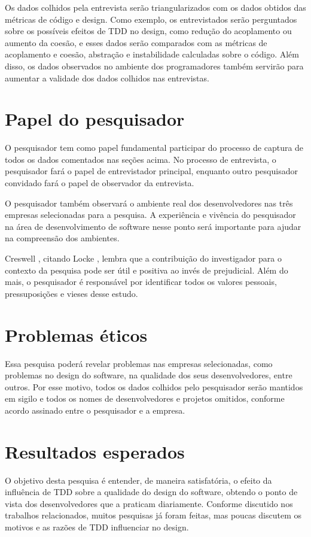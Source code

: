 Os dados colhidos pela entrevista serão triangularizados com os dados obtidos das métricas de código e design. 
Como exemplo, os entrevistados serão perguntados sobre os possíveis efeitos de TDD no design, como redução do acoplamento ou
aumento da coesão, e esses dados serão comparados com as métricas de acoplamento e coesão, abstração e instabilidade 
calculadas sobre o código.
Além disso, os dados observados no ambiente dos programadores também servirão para aumentar a validade dos 
dados colhidos nas entrevistas.

\section{Papel do pesquisador}
\label{sec:planejamento-papel}

O pesquisador tem como papel fundamental participar do processo de captura de todos os dados comentados
nas seções acima. No processo de entrevista, o pesquisador fará o papel de entrevistador principal, enquanto outro
pesquisador convidado fará o papel de observador da entrevista.

O pesquisador também observará o ambiente real dos desenvolvedores nas três empresas selecionadas
para a pesquisa. A experiência e vivência do pesquisador na área de desenvolvimento de software 
nesse ponto será importante para ajudar na compreensão dos ambientes. 

Creswell \cite{creswell}, citando Locke \cite{locke}, lembra
que a contribuição do investigador para o contexto da pesquisa pode ser útil e positiva ao invés de prejudicial.
Além do mais, o pesquisador é responsável por identificar todos os valores pessoais, pressuposições e vieses desse estudo.

\section{Problemas éticos}
\label{sec:planejamento-etica}

Essa pesquisa poderá revelar problemas nas empresas selecionadas, como problemas no design do software, na
qualidade dos seus desenvolvedores, entre outros. Por esse motivo, todos os dados colhidos pelo pesquisador
serão mantidos em sigilo e todos os nomes de desenvolvedores e projetos omitidos, conforme acordo assinado entre o pesquisador e a empresa.


\section{Resultados esperados}
\label{sec:planejamento-resultados-esperados}

O objetivo desta pesquisa é entender, de maneira satisfatória, o efeito da influência de TDD sobre a qualidade
do design do software, obtendo o ponto de vista dos desenvolvedores que a praticam diariamente. 
Conforme discutido nos trabalhos relacionados, muitos pesquisas já foram feitas, 
mas poucas discutem os motivos e as razões de TDD influenciar no design.

